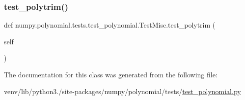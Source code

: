 \subsubsection{\texorpdfstring{test\+\_\+polytrim()}{test\_polytrim()}}
{\footnotesize\ttfamily def numpy.\+polynomial.\+tests.\+test\+\_\+polynomial.\+Test\+Misc.\+test\+\_\+polytrim (\begin{DoxyParamCaption}\item[{}]{self }\end{DoxyParamCaption})}



The documentation for this class was generated from the following file\+:\begin{DoxyCompactItemize}
\item 
venv/lib/python3./site-\/packages/numpy/polynomial/tests/\hyperlink{polynomial_2tests_2test__polynomial_8py}{test\+\_\+polynomial.\+py}\end{DoxyCompactItemize}

